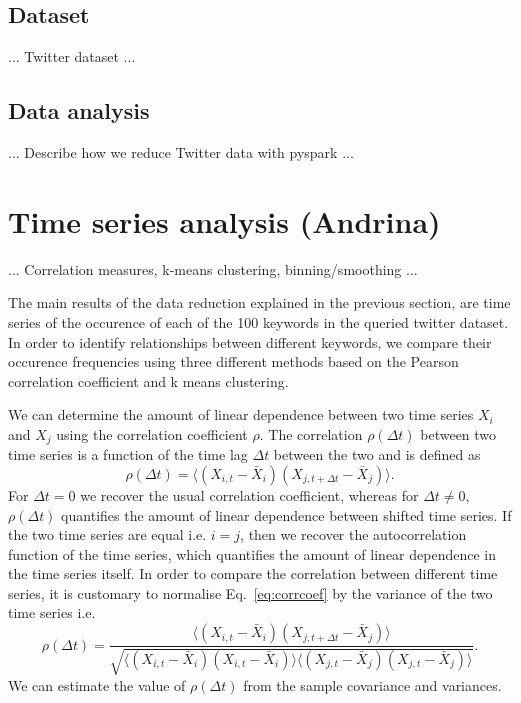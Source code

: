\documentclass[12pt, a4paper]{article}
\begin{document}
\subsection{Dataset}
... Twitter dataset ...

\subsection{Data analysis}
... Describe how we reduce Twitter data with pyspark ...


\section{Time series analysis (Andrina)}
... Correlation measures, k-means clustering, binning/smoothing ...

The main results of the data reduction explained in the previous section, are time series of the occurence of each of the 100 keywords in the queried twitter dataset. In order to identify relationships between different keywords, we compare their occurence frequencies using three different methods based on the Pearson correlation coefficient and k means clustering. 

We can determine the amount of linear dependence between two time series $X_{i}$ and $X_{j}$ using the correlation coefficient $\rho$. The correlation $\rho(\Delta t)$ between two time series is a function of the time lag $\Delta t$ between the two and is defined as \cite{dettling14}
\begin{equation}
\rho(\Delta t) = \langle (X_{i, t}-\bar{X}_{i}) (X_{j, t+\Delta t}-\bar{X}_{j}) \rangle. \label{eq:corrcoef}
\end{equation} 
For $\Delta t = 0$ we recover the usual correlation coefficient, whereas for $\Delta t \neq 0$, $\rho(\Delta t)$ quantifies the amount of linear dependence between shifted time series. If the two time series are equal i.e. $i = j$, then we recover the autocorrelation function of the time series, which quantifies the amount of linear dependence in the time series itself. In order to compare the correlation between different time series, it is customary to normalise Eq.~\ref{eq:corrcoef} by the variance of the two time series i.e. \cite{dettling14}
\begin{equation}
\rho(\Delta t) = \frac{\langle (X_{i, t}-\bar{X}_{i}) (X_{j, t+\Delta t}-\bar{X}_{j}) \rangle}{\sqrt{\langle (X_{i, t}-\bar{X}_{i}) (X_{i, t}-\bar{X}_{i}) \rangle \langle (X_{j, t}-\bar{X}_{j}) (X_{j, t}-\bar{X}_{j}) \rangle}}.
\end{equation} 
We can estimate the value of $\rho(\Delta t)$ from the sample covariance and variances.
\end{document}
